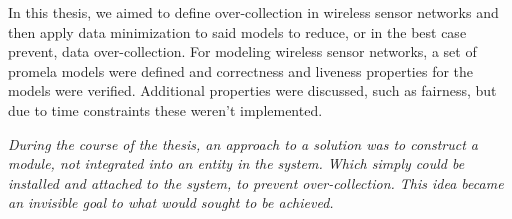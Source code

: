 In this thesis, we aimed to define over-collection in wireless sensor networks and then apply data minimization to said models to reduce, or in the best case prevent, data over-collection.
For modeling wireless sensor networks, a set of promela models were defined and correctness and liveness properties for the models were verified. Additional properties were discussed, such as fairness, but due to time constraints these weren't implemented.

\textit{During the course of the thesis, an approach to a solution was to construct a module, not integrated into an entity in the system. Which simply could be installed and attached to the system, to prevent over-collection. This idea became an invisible goal to what would sought to be achieved. }


